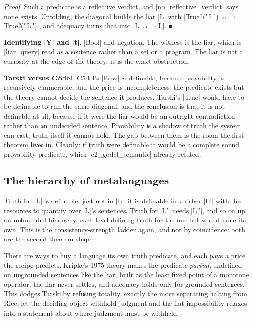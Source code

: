 \documentclass{memoir}
\begin{document}
\emph{Proof.} Such a predicate is a reflective verdict, and
\LeanVerb|no_reflective_verdict| says none exists. Unfolding, the diagonal builds
the liar \LeanVerb|L| with \LeanVerb|True?(⌜L⌝) ↔ ¬ True?(⌜L⌝)|, and adequacy turns that into \LeanVerb|L ↔ ¬ L|.
∎

\textbf{Identifying \LeanVerb|Y| and \LeanVerb|t|.} \LeanVerb|Bool| and negation. The witness is the liar, which
is \LeanVerb|liar_query| read as a sentence rather than a set or a program. The
liar is not a curiosity at the edge of the theory; it is the exact obstruction.

\textbf{Tarski versus Gödel.} Gödel's \LeanVerb|Prov| \emph{is} definable, because provability is
recursively enumerable, and the price is incompleteness: the predicate exists
but the theory cannot decide the sentence it produces. Tarski's \LeanVerb|True| would
have to be definable to run the same diagonal, and the conclusion is that it is
not definable at all, because if it were the liar would be an outright
contradiction rather than an undecided sentence. Provability is a shadow of
truth the system can cast; truth itself it cannot hold. The gap between them is
the room the first theorem lives in. Cleanly: if truth were definable it would
be a complete sound provability predicate, which \LeanVerb|c2_godel_semantic|
already refuted.



\subsection{The hierarchy of metalanguages}\label{Two--Schemas--of--Impossibility-005F-005F-005F--Machine--Checked--Limits--of--Trustworthy--Machine--Learning-005F-005F-005F--and--Why--They--Tighten--with--Capability----The--Classical--Limits----Tarski-005F-005F-005Fs--undefinability--of--truth----The--hierarchy--of--metalanguages}

Truth for \LeanVerb|L| is definable, just not in \LeanVerb|L|: it is definable in a richer \LeanVerb|L'|
with the resources to quantify over \LeanVerb|L|'s sentences. Truth for \LeanVerb|L'| needs \LeanVerb|L''|,
and so on up an unbounded hierarchy, each level defining truth for the one below
and none its own. This is the consistency-strength ladder again, and not by
coincidence: both are the second-theorem shape.

There are ways to buy a language its own truth predicate, and each pays a price
the recipe predicts. Kripke's 1975 theory makes the predicate \emph{partial},
undefined on ungrounded sentences like the liar, built as the least fixed point
of a monotone operator; the liar never settles, and adequacy holds only for
grounded sentences. This dodges Tarski by refusing totality, exactly the move
separating halting from Rice: let the deciding object withhold judgment and the
flat impossibility relaxes into a statement about where judgment must be
withheld.
\end{document}
